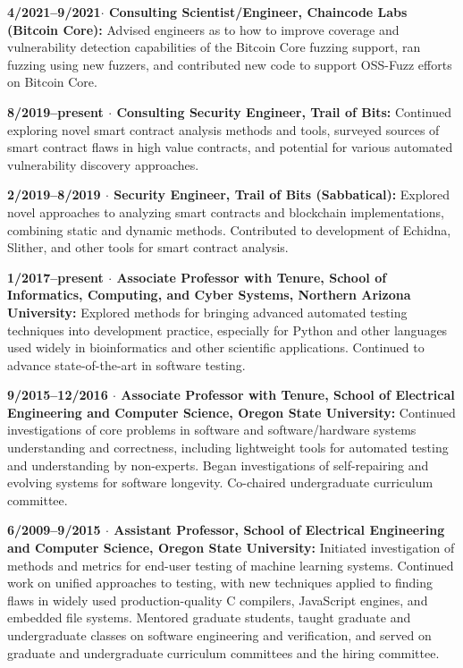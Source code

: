 \documentclass[ComputerScience]{vita}
\begin{document}
\begin{vita}
\begin{Experience}
\item {\bf 4/2021--9/2021$\cdot$ Consulting Scientist/Engineer,
    Chaincode Labs (Bitcoin Core):} Advised engineers as to how to
  improve coverage and vulnerability detection capabilities of the
  Bitcoin Core fuzzing support, ran fuzzing using new fuzzers, and
  contributed new code to support OSS-Fuzz efforts on Bitcoin Core. 
  
\item {\bf 8/2019--present $\cdot$ Consulting Security Engineer, Trail of Bits:} Continued exploring novel smart contract analysis methods and tools, surveyed sources of smart contract flaws in high value contracts, and potential for various automated vulnerability discovery approaches. 

\item {\bf 2/2019--8/2019 $\cdot$ Security Engineer, Trail of Bits
    (Sabbatical):} Explored novel approaches to analyzing smart
  contracts and blockchain implementations, combining static and dynamic
  methods.  Contributed to development of Echidna, Slither, and other
  tools for smart contract analysis.

\item {\bf 1/2017--present $\cdot$ Associate Professor with Tenure, School of Informatics, Computing, and Cyber Systems, Northern Arizona University:} Explored methods for bringing advanced automated testing techniques into development practice, especially for Python and other languages used widely in bioinformatics and other scientific applications.  Continued to advance state-of-the-art in software testing.

  \item {\bf 9/2015--12/2016 $\cdot$ Associate Professor with Tenure, School of Electrical Engineering and Computer Science, Oregon State University:} Continued investigations of core problems in software and software/hardware systems understanding and correctness, including lightweight tools for automated testing and understanding by non-experts.  Began investigations of self-repairing and evolving systems for software longevity.  Co-chaired undergraduate curriculum committee.

  \item {\bf 6/2009--9/2015 $\cdot$ Assistant Professor, School of
    Electrical Engineering and Computer Science, Oregon State
    University:} Initiated investigation of methods and metrics for
    end-user testing of machine learning systems.  Continued work
    on unified approaches to testing, with new techniques applied to finding flaws in widely used production-quality C compilers, JavaScript engines, and embedded file systems.  Mentored graduate
    students, taught graduate and undergraduate classes on software
    engineering and verification, and served on graduate and undergraduate curriculum committees and the hiring committee.


\end{Experience}
\end{vita}
\end{document}
